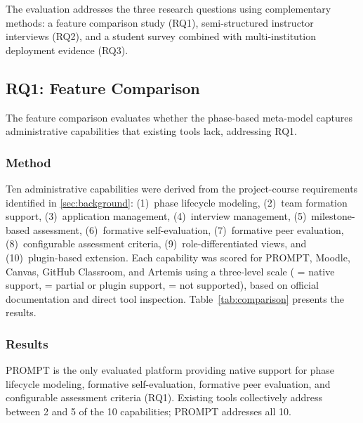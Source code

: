 
\label{sec:evaluation}

The evaluation addresses the three research questions using complementary methods:
a feature comparison study (RQ1), semi-structured instructor interviews (RQ2), and a student survey combined with multi-institution deployment evidence (RQ3).

\subsection{RQ1: Feature Comparison}

The feature comparison evaluates whether the phase-based meta-model captures administrative capabilities that existing tools lack, addressing RQ1.

\subsubsection{Method}

Ten administrative capabilities were derived from the project-course requirements identified in \autoref{sec:background}:
(1)~phase lifecycle modeling, (2)~team formation support, (3)~application management, (4)~interview management, (5)~milestone-based assessment, (6)~formative self-evaluation, (7)~formative peer evaluation, (8)~configurable assessment criteria, (9)~role-differentiated views, and (10)~plugin-based extension.
Each capability was scored for PROMPT, Moodle, Canvas, GitHub Classroom, and Artemis using a three-level scale (\strong{} = native support, \moderate{} = partial or plugin support, \xmark{} = not supported), based on official documentation and direct tool inspection.
Table~\ref{tab:comparison} presents the results.

\subsubsection{Results}

\begin{findingBox}
PROMPT is the only evaluated platform providing native support for phase lifecycle modeling, formative self-evaluation, formative peer evaluation, and configurable assessment criteria (RQ1).
Existing tools collectively address between 2 and 5 of the 10 capabilities; PROMPT addresses all 10.
\end{findingBox}


